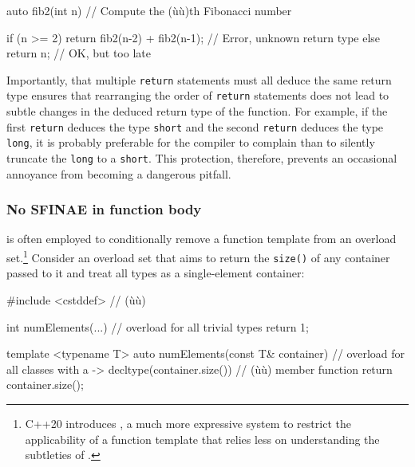\begin{emcppslisting}[emcppsstandards={c++14},emcppsignore={function too broken}]
auto fib2(int n)
    // Compute the (ù{}ù)th Fibonacci number
{

    if (n >= 2) { return fib2(n-2) + fib2(n-1); }  // Error, unknown return type
    else        { return n; }                      // OK, but too late
}
\end{emcppslisting}
    

\noindent Importantly, that multiple \lstinline!return! statements must all deduce
the same return type ensures that rearranging the order of
\lstinline!return! statements does not lead to subtle changes in the
deduced return type of the function. For example, if the first
\lstinline!return! deduces the type \lstinline!short! and the second
\lstinline!return! deduces the type \lstinline!long!, it is probably
preferable for the compiler to complain than to silently truncate the
\lstinline!long! to a \lstinline!short!. This protection, therefore, prevents
an occasional annoyance from becoming a dangerous pitfall.

\subsubsection[No SFINAE in function body]{No SFINAE in function body}\label{no-sfinae-in-function-body}

 is often employed to
conditionally remove a function template from an overload
set.{\cprotect\footnote{C++20 introduces , a much more
expressive system to restrict the applicability of a function template
  that relies less on understanding the subtleties of .}}
Consider an overload set that aims to return the \lstinline!size()! of any
container passed to it and treat all  types as a
single-element container:

\begin{emcppslisting}[emcppsbatch=e8,emcppsstandards={c++14}]
#include <cstddef>  // (ù{}ù)

int numElements(...)  // overload for all trivial types
{
    return 1;
}

template <typename T>
auto numElements(const T& container)  // overload for all classes with a
   -> decltype(container.size())      // (ù{}ù) member function
{
    return container.size();
}
\end{emcppslisting}
    

